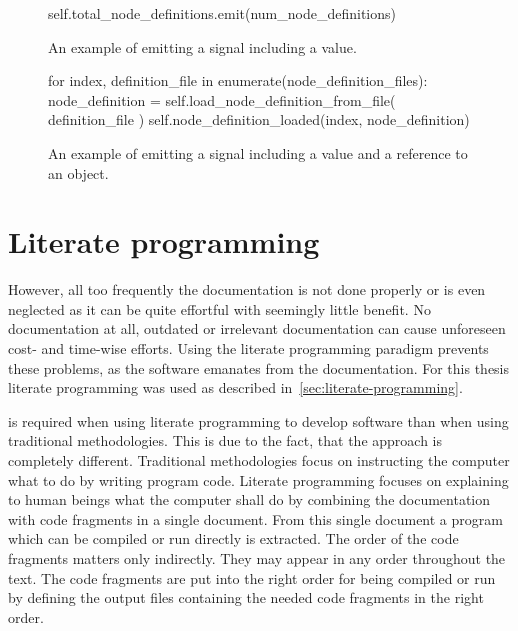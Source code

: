 \documentclass[%
    a4paper,    %
    justified,  %
    nobib,      %
    openany     %
]{tufte-book}
\begin{document}
\begin{figure}
  \begin{pythoncode}
self.total_node_definitions.emit(num_node_definitions)
  \end{pythoncode}
  \label{lst:signal-slot-example-1}
  \caption{%
    An example of emitting a signal including a value.
  }
\end{figure}

\begin{figure}
  \begin{pythoncode}
for index, definition_file in enumerate(node_definition_files):
    node_definition = self.load_node_definition_from_file(
        definition_file
    )
    self.node_definition_loaded(index, node_definition)
  \end{pythoncode}
  \label{lst:signal-slot-example-2}
  \caption{%
    An example of emitting a signal including a value and a reference to an
    object.
  }
\end{figure}

\section{Literate programming}
\label{results:sec:literate-programming}

 However, all too
frequently the documentation is not done properly or is even neglected as it can
be quite effortful with seemingly little benefit. No documentation at all,
outdated or irrelevant documentation can cause unforeseen cost- and time-wise
efforts. Using the literate programming paradigm prevents these problems, as the
software emanates from the documentation. For this thesis literate programming
was used as described in~\ref{sec:literate-programming}.


 is required when using literate
programming to develop software than when using traditional methodologies. This
is due to the fact, that the approach is completely different. Traditional
methodologies focus on instructing the computer what to do by writing program
code. Literate programming focuses on explaining to human beings what the
computer shall do by combining the documentation with code fragments in a single
document. From this single document a program which can be compiled or run
directly is extracted. The order of the code fragments matters only indirectly.
They may appear in any order throughout the text. The code fragments are put
into the right order for being compiled or run by defining the output files
containing the needed code fragments in the right order.
\end{document}
